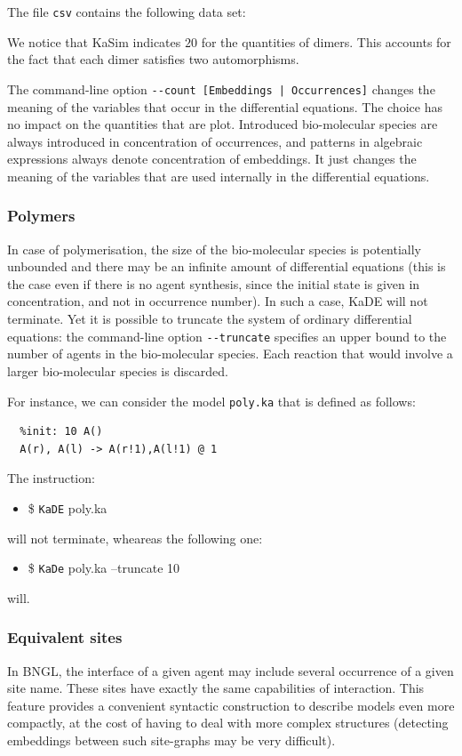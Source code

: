 \documentclass[11pt]{book}
\def\KaDE{\textsf{KaDE}}
\def\ttt#1{\texttt{#1}}
\def\ITE#1{\begin{itemize}#1\end{itemize}}
\begin{document}
The file \texttt{csv} contains the following data set:
{\lstset{numbers=none}}
{\lstset{numbers=left}}

We notice that KaSim indicates $20$ for the quantities of dimers.
This accounts for the fact that each dimer satisfies two automorphisms.


The command-line option \texttt{-{}-count [Embeddings | Occurrences]}
changes the meaning of the variables that occur in the differential equations. The choice has no impact on the quantities that are plot. Introduced bio-molecular species are always introduced in
concentration of occurrences, and patterns in algebraic expressions always denote concentration of embeddings. It just changes the meaning of the variables that are used internally in the differential equations.

\subsubsection{Polymers}

In case of polymerisation, the size of the bio-molecular species is potentially  unbounded and there may be an infinite amount of differential equations (this is the case even if there is no agent synthesis, since the initial state is given in concentration, and not in occurrence number). In such a case, {\KaDE} will not terminate. Yet it is possible to truncate the system of ordinary differential equations: the command-line option \texttt{-{}-truncate} specifies an upper bound to the number of agents in the bio-molecular species. Each reaction that would involve a larger bio-molecular species is discarded.

For instance, we can consider the model \texttt{poly.ka} that is defined as follows:
\begin{lstlisting}[language=kappa]
  %agent: A(l,r)
  %init: 10 A()
  A(r), A(l) -> A(r!1),A(l!1) @ 1
\end{lstlisting}

The instruction:
\ITE{\item[\$] \ttt{KaDE} poly.ka}
will not terminate, wheareas the following one:
\ITE{\item[\$] \ttt{KaDe} poly.ka --truncate 10}
will.


\subsubsection{Equivalent sites}
\label{sec:kade:ex}
In BNGL, the interface of a given agent may include several occurrence of a given site name. These sites have exactly the same capabilities of interaction. This feature provides a convenient syntactic construction to describe models even more compactly, at the cost of having to deal with more complex structures (detecting embeddings between such site-graphs may be very difficult).
\end{document}
